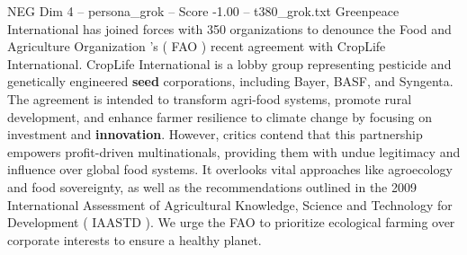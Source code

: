\begin{textsample}{NEG Dim 4 – persona\_grok – Score -1.00 – t380\_grok.txt}  \label{ex:f4_neg_030}
Greenpeace International has joined forces with 350 organizations to denounce the Food and Agriculture Organization 's ( FAO ) recent agreement with CropLife International.
CropLife International is a lobby group representing pesticide and genetically engineered \textbf{seed} corporations, including Bayer, BASF, and Syngenta.
The agreement is intended to transform agri-food systems, promote rural development, and enhance farmer resilience to climate change by focusing on investment and \textbf{innovation}.
However, critics contend that this partnership empowers profit-driven multinationals, providing them with undue legitimacy and influence over global food systems.
It overlooks vital approaches like agroecology and food sovereignty, as well as the recommendations outlined in the 2009 International Assessment of Agricultural Knowledge, Science and Technology for Development ( IAASTD ).
We urge the FAO to prioritize ecological farming over corporate interests to ensure a healthy planet.

\end{textsample}
